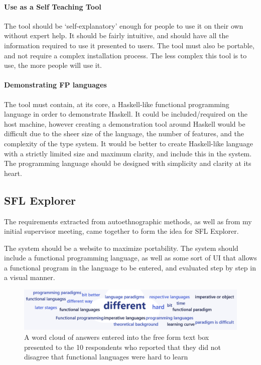 \paragraph{Use as a Self Teaching Tool} The tool should be `self-explanatory' enough for people to use it on their own without expert help. It should be fairly intuitive, and should have all the information required to use it presented to users. The tool must also be portable, and not require a complex installation process. The less complex this tool is to use, the more people will use it. 

\paragraph{Demonstrating FP languages} The tool must contain, at its core, a Haskell-like functional programming language in order to demonstrate Haskell. It could be included/required on the host machine, however creating a demonstration tool around Haskell would be difficult due to the sheer size of the language, the number of features, and the complexity of the type system. It would be better to create Haskell-like language with a strictly limited size and maximum clarity, and include this in the system. The programming language should be designed with simplicity and clarity at its heart.

\subsection{SFL Explorer}
The requirements extracted from autoethnographic methods, as well as from my initial supervisor meeting, came together to form the idea for SFL Explorer. 

The system should be a website to maximize portability. The system should include a functional programming language, as well as some sort of UI that allows a functional program in the language to be entered, and evaluated step by step in a visual manner. 

\begin{figure}[t]
    \centering
    \includegraphics[width=1\linewidth]{images/fp_is_hard_wordcloud.png}
    \caption{A word cloud of answers entered into the free form text box presented to the 10 respondents who reported that they did not disagree that functional languages were hard to learn}
    \label{fig:fp_wordcloud}
\end{figure}

